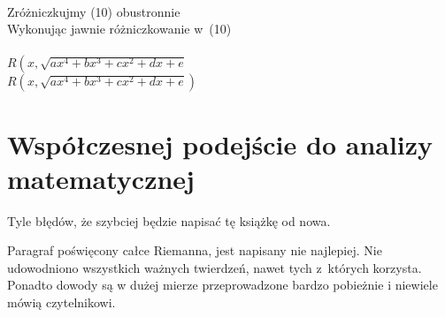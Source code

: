 \documentclass[a4paper,11pt]{article}
\begin{document}
\vspace{\spaceTwo}


 \\
\Jest  Zróżniczkujmy (10) obustronnie \\
\Powin Wykonując jawnie różniczkowanie w~(10) \\
 \\
\Jest  $R\left( x, \sqrt{ a x^{ 4 } + b x^{ 3 } + c x^{ 2 } + d x + e }
\right.$ \\
\Powin $R\left( x, \sqrt{ a x^{ 4 } + b x^{ 3 } + c x^{ 2 } + d x + e }
\right)$ \\












\section{Współczesnej podejście do analizy matematycznej}

\vspace{\spaceTwo}




\vspace{0em}



\vspace{0em}


\noindent
Tyle błędów, że szybciej będzie napisać tę książkę od nowa.

\vspace{\spaceFour}





\noindent
Paragraf poświęcony całce Riemanna, jest napisany nie
najlepiej. Nie udowodniono wszystkich ważnych twierdzeń, nawet tych
z~których korzysta. Ponadto dowody są w dużej mierze przeprowadzone
bardzo pobieżnie i niewiele mówią czytelnikowi.

\vspace{\spaceFour}
\end{document}
